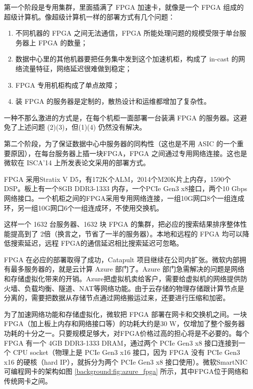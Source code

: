 第一个阶段是专用集群，里面插满了 FPGA 加速卡，就像是一个 FPGA 组成的超级计算机。像超级计算机一样的部署方式有几个问题：

\begin{enumerate}
	\item 不同机器的 FPGA 之间无法通信，FPGA 所能处理问题的规模受限于单台服务器上 FPGA 的数量；
	\item 数据中心里的其他机器要把任务集中发到这个加速机柜，构成了 in-cast 的网络流量特征，网络延迟很难做到稳定；
	\item FPGA 专用机柜构成了单点故障；
	\item 装 FPGA 的服务器是定制的，散热设计和运维都增加了复杂性。
\end{enumerate}

一种不那么激进的方式是，在每个机柜一面部署一台装满 FPGA 的服务器。这避免了上述问题 (2)(3)，但(1)(4) 仍然没有解决。

第二个阶段，为了保证数据中心中服务器的同构性（这也是不用 ASIC 的一个重要原因），在每台服务器上插一块FPGA，FPGA 之间通过专用网络连接。这也是微软在 ISCA’14 上所发表论文采用的部署方式。

FPGA 采用Stratix V D5，有172K个ALM，2014个M20K片上内存，1590个 DSP。板上有一个8GB DDR3-1333 内存，一个PCIe Gen3 x8接口，两个10 Gbps网络接口。一个机柜之间的FPGA采用专用网络连接，一组10G网口8个一组连成环，另一组10G网口6个一组连成环，不使用交换机。

这样一个 1632 台服务器、1632 块 FPGA 的集群，把必应的搜索结果排序整体性能提高到了 2倍（换言之，节省了一半的服务器）。本地和远程的 FPGA 均可以降低搜索延迟，远程 FPGA的通信延迟相比搜索延迟可忽略。

FPGA 在必应的部署取得了成功，Catapult 项目继续在公司内扩张。微软内部拥有最多服务器的，就是云计算 Azure 部门了。Azure 部门急需解决的问题是网络和存储虚拟化带来的开销。Azure把虚拟机卖给客户，需要给虚拟机的网络提供防火墙、负载均衡、隧道、NAT等网络功能。由于云存储的物理存储跟计算节点是分离的，需要把数据从存储节点通过网络搬运过来，还要进行压缩和加密。

为了加速网络功能和存储虚拟化，微软把 FPGA 部署在网卡和交换机之间。一块 FPGA（加上板上内存和网络接口等）的功耗大约是30 W，仅增加了整个服务器功耗的十分之一。只要规模足够大，对FPGA价格过高的担心将是不必要的。每个 FPGA 有一个 4GB DDR3-1333 DRAM，通过两个 PCIe Gen3 x8 接口连接到一个 CPU socket（物理上是 PCIe Gen3 x16 接口，因为 FPGA 没有 PCIe Gen3 x16 的硬核（hard IP），就拆分为两个 PCIe Gen3 x8 接口使用）。微软SmartNIC可编程网卡的架构如图 \ref{background:fig:azure_fpga} 所示，其中FPGA位于网络和传统网卡之间。

